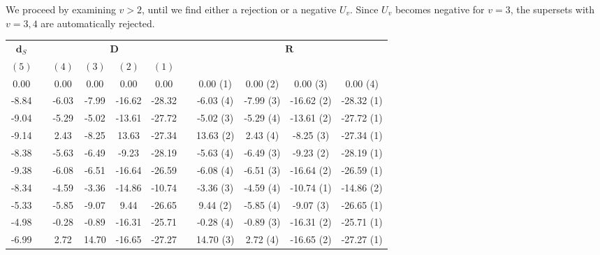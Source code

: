 \documentclass[11pt,a4paper,openright,twoside]{article}
\begin{document}
We proceed by examining $v>2$, until we find either a rejection or a negative $U_v$. Since $U_v$ becomes negative for $v=3$, the supersets with $v=3,4$ are automatically rejected.


\newpage

\begin{table}[h!]
\centering
\begin{tabular}{ccccccccccc}
$\mathbf{d}_S$ & & \multicolumn{4}{c}{$\mathbf{D}$} & & \multicolumn{4}{c}{$\mathbf{R}$}\\
$(5)$ &  & $(4)$ & $(3)$ & $(2)$ & $(1)$ &  &  &  &  &  \\
\cline{1-1} \cline{3-6} \cline{8-11}
0.00 &  & 0.00 & 0.00 & 0.00 & 0.00 &  & 0.00 (1)& 0.00 (2)& 0.00 (3)& 0.00 (4)\\
-8.84 &  & -6.03 & -7.99 & -16.62 & -28.32 &  & -6.03 (4)& -7.99 (3)& -16.62 (2)& -28.32 (1)\\
-9.04 &  & -5.29 & -5.02 & -13.61 & -27.72 &  & -5.02 (3)& -5.29 (4)& -13.61 (2)& -27.72 (1)\\
-9.14 &  & 2.43 & -8.25 & 13.63 & -27.34 &  & 13.63 (2)& 2.43 (4)& -8.25 (3)& -27.34 (1)\\
-8.38 &  & -5.63 & -6.49 & -9.23 & -28.19 &  & -5.63 (4)& -6.49 (3)& -9.23 (2)& -28.19 (1)\\
-9.38 &  & -6.08 & -6.51 & -16.64 & -26.59 &  & -6.08 (4)& -6.51 (3)& -16.64 (2)& -26.59 (1)\\
-8.34 &  & -4.59 & -3.36 & -14.86 & -10.74 &  & -3.36 (3)& -4.59 (4)& -10.74 (1)& -14.86 (2)\\
-5.33 &  & -5.85 & -9.07 & 9.44 & -26.65 &  & 9.44 (2)& -5.85 (4)& -9.07 (3)& -26.65 (1)\\
-4.98 &  & -0.28 & -0.89 & -16.31 & -25.71 &  & -0.28 (4)& -0.89 (3)& -16.31 (2)& -25.71 (1)\\
-6.99 &  & 2.72 & 14.70 & -16.65 & -27.27 &  & 14.70 (3)& 2.72 (4)& -16.65 (2) & -27.27 (1)
\end{tabular}
\end{table}
\end{document}
